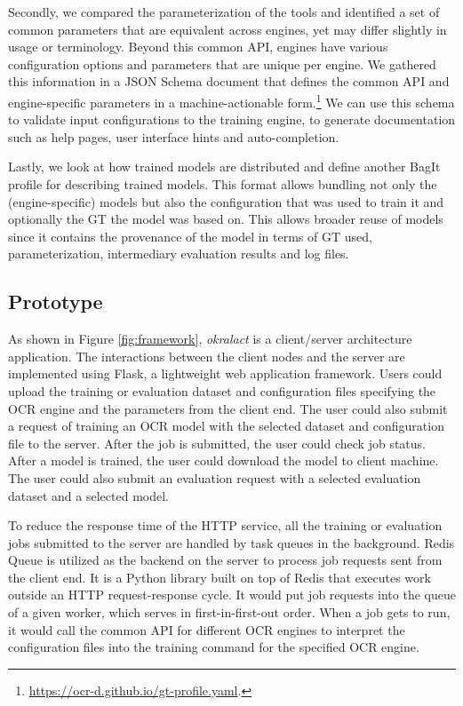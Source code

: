 \documentclass[conference]{IEEEtran}
\begin{document}
Secondly, we compared the parameterization of the tools and
identified a set of common parameters that are equivalent across
engines, yet may differ slightly in usage or terminology. Beyond
this common API, engines have various configuration options and
parameters that are unique per engine. We gathered this information
in a JSON Schema document that defines the common API and
engine-specific parameters in a machine-actionable
form.\footnote{\url{https://ocr-d.github.io/gt-profile.yaml}.} We
can use this schema to validate input configurations to the
training engine, to generate documentation such as help pages, user
interface hints and auto-completion.

Lastly, we look at how trained models are distributed and
define another BagIt profile for describing trained models. This
format allows bundling not only the (engine-specific) models but
also the configuration that was used to train it and optionally the
GT the model was based on. This allows broader reuse of models
since it contains the provenance of the model in terms of GT used,
parameterization, intermediary evaluation results and log files.


\subsection*{Prototype}
\label{sec:prototype}

As shown in Figure \ref{fig:framework}, \textit{okralact} is a client/server
architecture application. The interactions between the client nodes and the
server are implemented using Flask, a lightweight web application framework.
Users could upload the training or evaluation dataset and configuration files
specifying the OCR engine and the parameters    from the client end. The user
could also submit a request of training an OCR    model with the selected
dataset and configuration file to the server. After the job is submitted, the
user could check job status. After a model is trained,    the user could
download the model to client machine. The user could also submit an evaluation
request with a selected evaluation dataset and a selected model.

To reduce the response time of the HTTP service, all the training or evaluation
jobs submitted to the server are handled by task queues in the background.
Redis Queue is utilized as the backend on the server to process job requests
sent from the     client end. It is a Python library built on top of Redis that
executes work  outside an HTTP request-response cycle.  It would put job
requests into the      queue of a given worker, which serves in
first-in-first-out order. When a job   gets to run, it would call the common
API for different OCR engines to interpret the configuration files into the
training command for the specified OCR engine.
\end{document}
